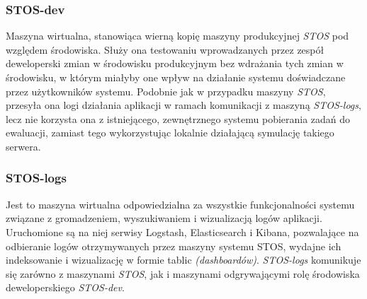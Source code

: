 \subsubsection{STOS-dev}
Maszyna wirtualna, stanowiąca wierną kopię maszyny produkcyjnej \textit{STOS} pod względem środowiska. Służy ona testowaniu wprowadzanych przez zespół deweloperski zmian w środowisku produkcyjnym bez wdrażania tych zmian w środowisku, w którym miałyby one wpływ na działanie systemu doświadczane przez użytkowników systemu. Podobnie jak w przypadku maszyny \textit{STOS}, przesyła ona logi działania aplikacji w ramach komunikacji z maszyną \textit{STOS-logs}, lecz nie korzysta ona z istniejącego, zewnętrznego systemu pobierania zadań do ewaluacji, zamiast tego wykorzystując lokalnie działającą symulację takiego serwera.

\subsubsection{STOS-logs}
Jest to maszyna wirtualna odpowiedzialna za wszystkie funkcjonalności systemu związane z gromadzeniem, wyszukiwaniem i wizualizacją logów aplikacji. Uruchomione są na niej serwisy Logstash, Elasticsearch i Kibana, pozwalające na odbieranie logów otrzymywanych przez maszyny systemu STOS, wydajne ich indeksowanie i wizualizację w formie tablic \textit{(dashboardów)}. \textit{STOS-logs} komunikuje się zarówno z maszynami \textit{STOS}, jak i maszynami odgrywającymi rolę środowiska deweloperskiego \textit{STOS-dev}. 

